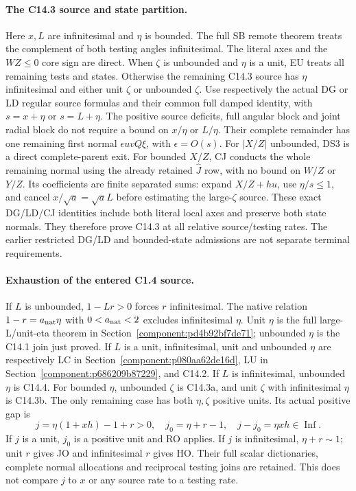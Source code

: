\paragraph{The C14.3 source and state partition.}
Here $x,L$ are infinitesimal and $\eta$ is bounded.
The full SB remote theorem treats the complement of both testing
angles infinitesimal.  The literal axes and the $WZ\le0$ core
sign are direct.  When $\zeta$ is unbounded and $\eta$ is a
unit, EU treats all remaining tests and states.  Otherwise the
remaining C14.3 source has $\eta$ infinitesimal and either unit
$\zeta$ or unbounded $\zeta$.  Use respectively the actual
DG or LD regular source formulas and their common full damped
identity, with $s=x+\eta$ or $s=L+\eta$.
The positive source deficits, full angular block and joint radial
block do not require a bound on $x/\eta$ or $L/\eta$.
Their complete remainder has one remaining first normal
$\epsilon uvQ\xi$, with $\epsilon=O(s)$.
For $|X/Z|$ unbounded, DS3 is a direct complete-parent exit.
For bounded $X/Z$, CJ conducts the whole remaining normal using
the already retained $\widehat J$ row, with no bound on $W/Z$
or $Y/Z$.  Its coefficients are finite separated sums: expand
$X/Z+hu$, use $\eta/s\le1$, and cancel
$x/\sqrt a=\sqrt aL$ before estimating the large-$\zeta$
source.  These exact DG/LD/CJ identities include both literal
local axes and preserve both state normals.  They therefore prove
C14.3 at all relative source/testing rates.  The earlier restricted
DG/LD and bounded-state admissions are not separate terminal
requirements.

\paragraph{Exhaustion of the entered C1.4 source.}
If $L$ is unbounded, $1-Lr>0$ forces $r$ infinitesimal.
The native relation $1-r=a_{\rm nat}\eta$ with
$0<a_{\rm nat}<2$ excludes infinitesimal $\eta$.
Unit $\eta$ is the full large-L/unit-eta theorem in Section~\ref{component:pd4b92bf7de71};
unbounded $\eta$ is the C14.1 join just proved.
If $L$ is a unit, infinitesimal, unit and unbounded $\eta$
are respectively LC in Section~\ref{component:p080aa62de16d}, LU in Section~\ref{component:p686209b87229}, and C14.2.
If $L$ is infinitesimal, unbounded $\eta$ is C14.4.
For bounded $\eta$, unbounded $\zeta$ is C14.3a, and unit
$\zeta$ with infinitesimal $\eta$ is C14.3b.  The only
remaining case has both $\eta,\zeta$ positive units.  Its actual
positive gap is
\[
 j=\eta(1+xh)-1+r>0,\quad j_0=\eta+r-1,
                   \quad j-j_0=\eta xh\in\operatorname{Inf}.
                                                               \tag{JC6}
\]
If $j$ is a unit, $j_0$ is a positive unit and RO applies.
If $j$ is infinitesimal, $\eta+r\sim1$; unit $r$ gives JO
and infinitesimal $r$ gives HO.  Their full scalar dictionaries,
complete normal allocations and reciprocal testing joins are retained.
This does not compare $j$ to $x$ or any source rate to a testing rate.

